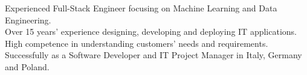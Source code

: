 %
%
%
\par{
Experienced Full-Stack Engineer focusing on Machine Learning and Data Engineering. \\
Over 15 years' experience designing, developing and deploying IT applications. \\
High competence in understanding customers' needs and requirements. \\
Successfully as a Software Developer and IT Project Manager in Italy, Germany and Poland.  \\
}